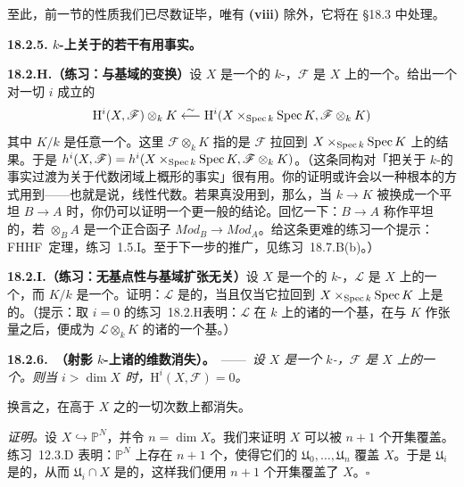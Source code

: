 至此，前一节的性质我们已尽数证毕，唯有 \textbf{(viii)} 除外，它将在 \S18.3 中处理。

\textbf{18.2.5. $k$-\trScheme{}上关于\trCohomology{}的若干有用事实。}

\textbf{18.2.H.（练习：\trCohomology{}与基域的变换）}\quad 设 $X$ 是一个\trQuasicompact\trSeparated{}的 $k$-\trScheme，$\mathscr{F}$ 是 $X$ 上的一个\trQCSheaf。给出一个对一切 $i$ 成立的\trIsomorphism
\[
\mathrm{H}^i(X,\mathscr{F})\otimes_k K\overset{\sim}{\longleftarrow}\mathrm{H}^i(X\times_{\operatorname{Spec} k}\operatorname{Spec} K,\mathscr{F}\otimes_k K)
\]
其中 $K/k$ 是任意一个\trFieldExtension。这里 $\mathscr{F}\otimes_k K$ 指的是 $\mathscr{F}$ 拉回到 $X\times_{\operatorname{Spec} k}\operatorname{Spec} K$ 上的结果。于是 $h^i(X,\mathscr{F})=h^i(X\times_{\operatorname{Spec} k}\operatorname{Spec} K,\mathscr{F}\otimes_k K)$。（这条同构对「把关于 $k$-\trScheme{}的事实过渡为关于代数闭域上概形的事实」很有用。你的证明或许会以一种根本的方式用到\trVectorSpace{}——也就是说，线性代数。若果真没用到，那么，当 $k\to K$ 被换成一个平坦\trRingMorphism{} $B\to A$ 时，你仍可以证明一个更一般的结论。回忆一下：$B\to A$ 称作平坦的，若 $\otimes_B A$ 是一个正合函子 $\mathit{Mod}_B\to\mathit{Mod}_A$。给这条更难的练习一个提示：\mbox{FHHF 定理}，\mbox{练习~1.5.I}。至于下一步的推广，见\mbox{练习~18.7.B(b)}。）

\textbf{18.2.I.（练习：无基点性与基域扩张无关）}\quad 设 $X$ 是一个\trQuasicompact\trSeparated{}的 $k$-\trScheme，$\mathscr{L}$ 是 $X$ 上的一个\trInvertibleSheaf，而 $K/k$ 是一个\trFieldExtension。证明：$\mathscr{L}$ 是\trBasePointFree{}的，当且仅当它拉回到 $X\times_{\operatorname{Spec} k}\operatorname{Spec} K$ 上是\trBasePointFree{}的。（提示：取 $i=0$ 的\mbox{练习~18.2.H}表明：$\mathscr{L}$ 在 $k$ 上的诸\trSection{}的一个基，在与 $K$ 作张量之后，便成为 $\mathscr{L}\otimes_k K$ 的诸\trSection{}的一个基。）

\textbf{18.2.6.\ \trhTheorem{}（射影 $k$-\trScheme{}上诸\trQCSheaf{}的维数\trCohomology{}消失）。}\ ——\ \emph{设 $X$ 是一个\trProjective{} $k$-\trScheme，$\mathscr{F}$ 是 $X$ 上的一个\trQCSheaf。则当 $i>\dim X$ 时，$\mathrm{H}^i(X,\mathscr{F})=0$。}

换言之，\trCohomology{}在高于 $X$ 之\trDimension{}的一切次数上都消失。

\emph{证明。}\quad 设 $X\hookrightarrow\mathbb{P}^N$，并令 $n=\dim X$。我们来证明 $X$ 可以被 $n+1$ 个\trAffine{}开集覆盖。\mbox{练习~12.3.D} 表明：$\mathbb{P}^N$ 上存在 $n+1$ 个\trEffectiveCartierDivisor，使得它们的\trComplement{} $\mathfrak{U}_0,\dots,\mathfrak{U}_n$ 覆盖 $X$。于是 $\mathfrak{U}_i$ 是\trAffine{}的，从而 $\mathfrak{U}_i\cap X$ 是\trAffine{}的，这样我们便用 $n+1$ 个\trAffine{}开集覆盖了 $X$。\hfill$\square$

